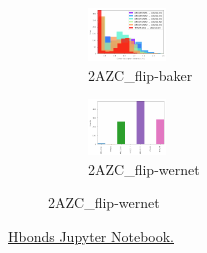 \documentclass[fleqn,10pt]{wlscirep}
\begin{document}
\begin{figure}[!ht]
\centering
\begin{subfigure}{.5\textwidth}
  \centering
  \includegraphics[width=.95\linewidth]{2AZC_flip/2AZC_flip-baker}
  \caption{2AZC_{flip}-baker}
  \label{fig:2AZC_flip-baker}
\end{subfigure}%
\begin{subfigure}{.5\textwidth}
  \centering
  \includegraphics[width=.95\linewidth]{2AZC_flip/2AZC_flip-wernet}
\caption{2AZC_{flip}-wernet}
\label{fig:2AZC_flip-wernet}
\end{subfigure}
\end{figure}

\href{https://github.com/nathanmlim/Spitale/blob/master/manual_md/notebooks/Hbonds.ipynb}{Hbonds Jupyter Notebook.}
\end{document}
